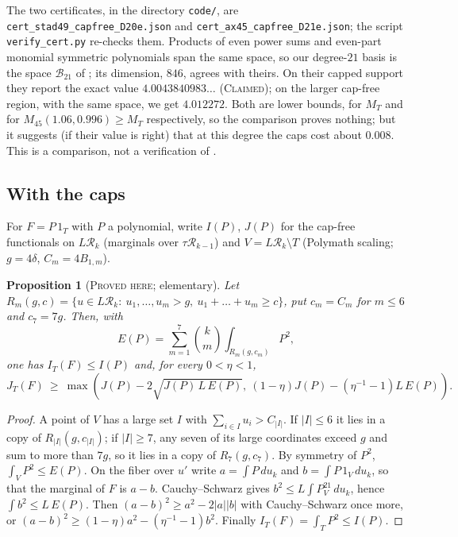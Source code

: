 \documentclass[11pt]{amsart}
\newtheorem{proposition}[theorem]{Proposition}
\theoremstyle{definition}
\theoremstyle{remark}
\newcommand{\lbl}[1]{\textup{\textsc{#1}}}
\newcommand{\R}{\mathcal{R}}
\begin{document}
\begin{sloppypar}
The two certificates, in the directory \texttt{code/}, are
\texttt{cert\_stad49\_capfree\_D20e.json} and
\texttt{cert\_ax45\_capfree\_D21e.json}; the script
\texttt{verify\_cert.py} re-checks them. Products of even power sums and
even-part monomial symmetric polynomials span the same space, so our degree-$21$
basis is the space $\mathcal B_{21}$ of \cite[Thm.~11.1]{Cha26}; its dimension,
$846$, agrees with theirs. On their capped support they report the exact value
$4.0043840983\ldots$ (\lbl{Claimed}); on the larger cap-free region, with the
same space, we get $4.012272$. Both are lower bounds, for $M_T$ and for
$M_{45}(1.06,0.996)\ge M_T$ respectively, so the comparison proves nothing;
but it suggests (if their value is right) that at this degree the caps cost
about $0.008$. This is a comparison, not a verification of \cite{Cha26}.
\end{sloppypar}

\subsection*{With the caps}
For $F=P\,1_T$ with $P$ a polynomial, write $I(P)$, $J(P)$ for the cap-free
functionals on $L\R_k$ (marginals over $\tau\R_{k-1}$) and $V=L\R_k\setminus T$
(Polymath scaling; $g=4\delta$, $C_m=4B_{1,m}$).

\begin{proposition}[\lbl{Proved here}; elementary]\label{prop:caps}
Let $R_m(g,c)=\{u\in L\R_k:\ u_1,\dots,u_m>g,\ u_1+\dots+u_m\ge c\}$, put
$c_m=C_m$ for $m\le6$ and $c_7=7g$. Then, with
\[
E(P)=\sum_{m=1}^{7}\binom km\int_{R_m(g,c_m)}P^2 ,
\]
one has $I_T(F)\le I(P)$ and, for every $0<\eta<1$,
\[
J_T(F)\ \ge\ \max\left(J(P)-2\sqrt{J(P)\,L\,E(P)},\ (1-\eta)J(P)-(\eta^{-1}-1)L\,E(P)\right).
\]
\end{proposition}

\begin{proof}
A point of $V$ has a large set $I$ with $\sum_{i\in I}u_i>C_{|I|}$. If
$|I|\le6$ it lies in a copy of $R_{|I|}(g,c_{|I|})$; if $|I|\ge7$, any seven
of its large coordinates exceed $g$ and sum to more than $7g$, so it lies in
a copy of $R_7(g,c_7)$. By symmetry of $P^2$, $\int_VP^2\le E(P)$. On the
fiber over $u'$ write $a=\int P\,du_k$ and $b=\int P\,1_V\,du_k$, so that the
marginal of $F$ is $a-b$. Cauchy--Schwarz gives $b^2\le L\int P^21_V\,du_k$,
hence $\int b^2\le L\,E(P)$. Then $(a-b)^2\ge a^2-2|a||b|$ with
Cauchy--Schwarz once more, or $(a-b)^2\ge(1-\eta)a^2-(\eta^{-1}-1)b^2$.
Finally $I_T(F)=\int_TP^2\le I(P)$.
\end{proof}
\end{document}
